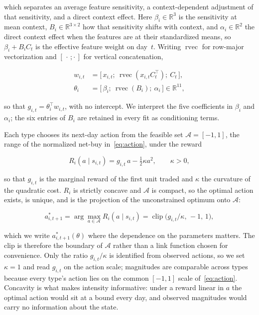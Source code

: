 which separates an average feature sensitivity, a context-dependent
adjustment of that sensitivity, and a direct context effect. Here
$\beta_i \in \mathbb{R}^3$ is the sensitivity at mean context,
$B_i \in \mathbb{R}^{3 \times 2}$ how that sensitivity shifts with
context, and $\alpha_i \in \mathbb{R}^2$ the direct context effect when
the features are at their standardized means, so $\beta_i + B_i C_t$ is
the effective feature weight on day~$t$. Writing $\operatorname{rvec}$
for row-major vectorization and $[\,\cdot\,;\cdot\,]$ for vertical
concatenation,

\begin{equation}
  \label{eq:vec}
  \begin{aligned}
    w_{i,t} &= \bigl[\, x_{i,t};\ \operatorname{rvec}(x_{i,t} C_t^{\top});\ C_t \,\bigr], \\
    \theta_i &= \bigl[\, \beta_i;\ \operatorname{rvec}(B_i);\ \alpha_i \,\bigr]
      \in \mathbb{R}^{11},
  \end{aligned}
\end{equation}

so that $g_{i,t} = \theta_i^{\top} w_{i,t}$, with no intercept. We
interpret the five coefficients in $\beta_i$ and $\alpha_i$; the six
entries of $B_i$ are retained in every fit as conditioning terms.

Each type chooses its next-day action from the feasible set
$\mathcal{A} = [-1, 1]$, the range of the normalized net-buy
in~\eqref{eq:action}, under the reward

\begin{equation}
  \label{eq:reward}
  R_i(a \mid s_{i,t}) = g_{i,t}\, a - \tfrac{1}{2}\kappa a^2,
  \qquad \kappa > 0,
\end{equation}

so that $g_{i,t}$ is the marginal reward of the first unit traded and
$\kappa$ the curvature of the quadratic cost. $R_i$ is strictly concave
and $\mathcal{A}$ is compact, so the optimal action exists, is unique,
and is the projection of the unconstrained optimum onto $\mathcal{A}$:

\begin{equation}
  \label{eq:optimal}
  a^{*}_{i,t+1} = \arg\max_{a \in \mathcal{A}} R_i(a \mid s_{i,t})
  = \operatorname{clip}\!\bigl(g_{i,t}/\kappa,\, -1,\, 1\bigr),
\end{equation}

which we write $a^{*}_{i,t+1}(\theta)$ where the dependence on the
parameters matters. The clip is therefore the boundary of $\mathcal{A}$
rather than a link function chosen for convenience. Only the ratio
$g_{i,t}/\kappa$ is identified from observed actions, so we set
$\kappa = 1$ and read $g_{i,t}$ on the action scale; magnitudes are
comparable across types because every type's action lies on the common
$[-1,1]$ scale of~\eqref{eq:action}. Concavity is what makes intensity
informative: under a reward linear in $a$ the optimal action would sit at
a bound every day, and observed magnitudes would carry no information
about the state.

